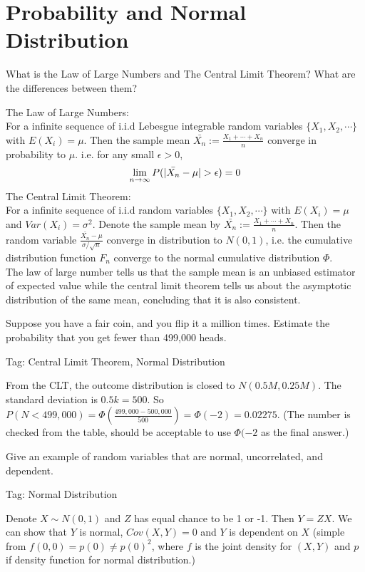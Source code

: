 \section{Probability and Normal Distribution}
\begin{exe}
What is the Law of Large Numbers and The Central Limit Theorem? What are the differences between them?
\end{exe}
\begin{teacher}
\begin{sol}
The Law of Large Numbers:\\
For a infinite sequence of i.i.d Lebesgue integrable random variables $\{X_1, X_2, \cdots\}$ with $E(X_i) = \mu$. Then the sample mean $\bar{X_n} := \frac{X_1+\cdots+X_n}{n}$ converge in probability to $\mu$. i.e. for any small $\epsilon>0$, 
$$\lim_{n\rightarrow \infty} P(|\Bar{X_n}-\mu| >\epsilon) = 0$$
The Central Limit Theorem:\\
For a infinite sequence of i.i.d random variables $\{X_1, X_2, \cdots\}$ with $E(X_i) = \mu$ and $Var(X_i) = \sigma^2$. Denote the sample mean by $\bar{X_n} := \frac{X_1+\cdots+X_n}{n}$. Then the random variable $\frac{\bar{X_n} - \mu}{\sigma/\sqrt{n}}$ converge in distribution to $N(0, 1)$, i.e. the cumulative distribution function $F_n$ converge to the normal cumulative distribution $\Phi$.\\
The law of large number tells us that the sample mean is an unbiased estimator of expected value while the central limit theorem tells us about the asymptotic distribution of the same mean, concluding that it is also consistent. 
\end{sol}
\end{teacher}

\begin{exe}
Suppose you have a fair coin, and you flip it a million times. Estimate the probability that you get fewer than 499,000 heads.
\end{exe}
\begin{teacher}
Tag: Central Limit Theorem, Normal Distribution
\begin{sol}
From the CLT, the outcome distribution is closed to $N(0.5M, 0.25M)$. The standard deviation is $0.5k=500$. So $P(N<499,000) = \Phi(\frac{499,000 - 500, 000}{500}) = \Phi(-2) = 0.02275$. (The number is checked from the table, should be acceptable to use $\Phi(-2$ as the final answer.)
\end{sol}
\end{teacher}

\begin{exe}
Give an example of random variables that are normal, uncorrelated, and dependent.
\end{exe}
\begin{teacher}
Tag: Normal Distribution
\begin{sol}
Denote $X\sim N(0,1)$ and $Z$ has equal chance to be 1 or -1. Then $Y=ZX$. We can show that $Y$ is normal, $Cov(X, Y)=0$ and $Y$ is dependent on $X$ (simple from $f(0, 0) = p(0)\neq p(0)^2$, where $f$ is the joint density for $(X, Y)$ and $p$ if density function for normal distribution.)
\end{sol}
\end{teacher}

